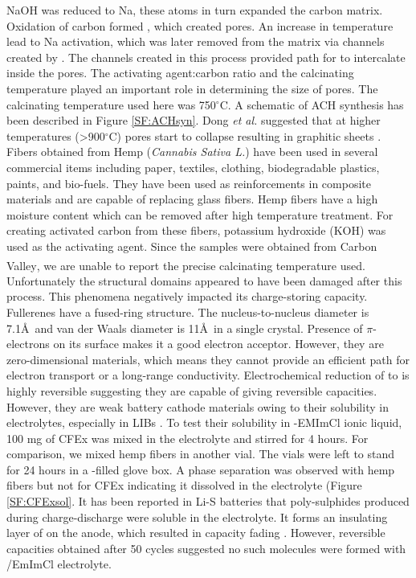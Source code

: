 NaOH was reduced to Na, these atoms in turn expanded the carbon matrix. Oxidation of carbon formed , which created pores. An increase in temperature lead to Na activation, which was later removed from the matrix via channels created by . The channels created in this process provided path for  to intercalate inside the pores. The activating agent:carbon ratio and the calcinating temperature played an important role in determining the size of pores. The calcinating temperature used here was 750$^{\circ}$C. A schematic of ACH synthesis has been described in Figure \ref{SF:ACHsyn}. Dong \textit{et al.} suggested that at higher temperatures (>900$^{\circ}$C) pores start to collapse resulting in graphitic sheets \cite{dong_commercial_2019}. 
Fibers obtained from Hemp (\textit{Cannabis Sativa L.}) have been used in several commercial items including paper, textiles, clothing, biodegradable plastics, paints, and bio-fuels. They have been used as reinforcements in composite materials and are capable of replacing glass fibers. Hemp fibers have a high moisture content which can be removed after high temperature treatment\cite{hussain_development_2019}. For creating activated carbon from these fibers, potassium hydroxide (KOH) was used as the activating agent. Since the samples were obtained from Carbon Valley\textsuperscript{\textregistered}, we are unable to report the precise calcinating temperature used. Unfortunately the structural domains appeared to have been damaged after this process. This phenomena negatively impacted its charge-storing capacity.  
Fullerenes have a fused-ring structure. The nucleus-to-nucleus diameter is 7.1\AA\ and van der Waals diameter is 11\AA\ in a single crystal. Presence of $\pi$-electrons on its surface makes it a good electron acceptor. However, they are zero-dimensional materials, which means they cannot provide an efficient path for electron transport or a long-range conductivity\cite{loutfy_fullerene_2002, winkler_two-component_2007}. Electrochemical reduction of  to  is highly reversible suggesting they are capable of giving reversible capacities. However, they are weak battery cathode materials owing to their solubility in electrolytes, especially in LIBs \cite{seger_prospects_1991}. To test their solubility in -EMImCl ionic liquid, 100 mg of CFEx was mixed in the electrolyte and stirred for 4 hours. For comparison, we mixed hemp fibers in another vial. The vials were left to stand for 24 hours in a -filled glove box. A phase separation was observed with hemp fibers but not for CFEx indicating it dissolved in the electrolyte (Figure \ref{SF:CFExsol}. It has been reported in Li-S batteries that poly-sulphides produced during charge-discharge were soluble in the electrolyte. It forms an insulating layer of  on the anode, which resulted in capacity fading \cite{sun_effect_2017, yan_2d_nodate}. However, reversible capacities obtained after 50 cycles suggested no such molecules were formed with /EmImCl electrolyte. 
